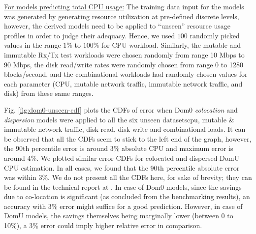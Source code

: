 \underline{For models predicting total CPU usage:}
The training data input for the models was generated
by generating resource utilization at pre-defined discrete 
levels, however, the derived models
need to be applied to ``unseen'' resource usage profiles
in order to judge their adequacy. Hence, we used
$100$ randomly picked values in the range $1\%$
to $100\%$ for CPU workload. Similarly, the 
mutable and immutable 
Rx/Tx test workloads
were chosen randomly from range 10 Mbps to 90 Mbps, the
disk read/write rates were randomly chosen from range
0 to 1280 blocks/second, and the combinational workloads 
had randomly chosen values for each parameter (CPU, mutable
network traffic, immutable network traffic,
and disk) from these same ranges.

Fig. \ref{fig:dom0-unseen-cdf} plots the CDFs of error when
Dom0 \emph{colocation} and \emph{dispersion} models were applied to all the
six unseen datasets\textemdash{}cpu, mutable \& immutable network traffic, disk read,
disk write and combinational loads. It can be observed that
all the CDFs seem to stick to the left end of the graph, however,
the 90th percentile
error is around 3\% absolute CPU and maximum error is around 4\%. 
We plotted similar error
CDFs for colocated and dispersed DomU CPU estimation. In 
all cases, we found that
the 90th percentile absolute error was within 3\%. We do
not present all the CDFs here, for sake of brevity; they can
be found in the technical report at \cite{affine-modeling-tech-report}.
In case of Dom0 models, 
since the savings due to co-location
is significant (as concluded from the benchmarking results), an
accuracy with 3\% error might suffice for a good prediction. However, in
case of DomU models, 
the savings themselves being marginally 
lower (between 0 to 10\%), a 3\% error could imply higher 
relative error in comparison. 

